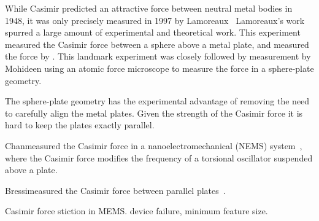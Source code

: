\begin{itemize}
While Casimir predicted an attractive force between neutral metal bodies in 1948,
it was only precisely measured in 1997 by Lamoreaux~\cite{Lamoreaux1997}
Lamoreaux's work spurred a large amount of experimental and theoretical work.  
This experiment measured the Casimir force between a sphere above a metal plate,
and measured the force by \comment{\ldots}.  
This landmark experiment was closely followed by measurement by Mohideen\etal\cite{Mohideen1998}
using an atomic force microscope to measure the force in a sphere-plate geometry.  

The sphere-plate geometry has the experimental advantage of removing the need to carefully
align the metal plates.  Given the strength of the Casimir force it is hard to 
keep the plates exactly parallel.  

Chan\etal measured the Casimir force in a nanoelectromechanical (NEMS) system~\cite{Chan2001},
where the Casimir force modifies the frequency of a torsional oscillator suspended
above a plate.  

Bressi\etal measured the Casimir force between parallel plates~\cite{Bressi2002}.  

Casimir force stiction in MEMS.  device failure, minimum feature size.~\cite{Buks2001}


\end{itemize}
